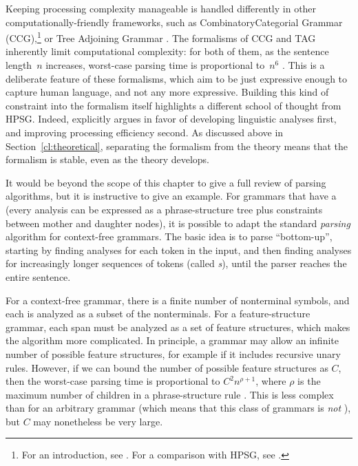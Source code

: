 \documentclass[output=paper,biblatex,babelshorthands,newtxmath,draftmode,colorlinks,citecolor=brown]{langscibook}
\begin{document}
\largerpage 
Keeping processing complexity manageable is handled differently in other computationally-friendly frameworks, such as Combinatory\indexccg Categorial Grammar (CCG),\footnote{%
	For an introduction, see \citet{steedman2011ccg}.
	For a comparison with HPSG, see .
}
or Tree Adjoining Grammar \citep[TAG;][]{Joshi87a-u,SAJ88a-u}.
The formalisms of CCG and TAG inherently limit computational complexity:
for both of them, as the sentence length~$n$ increases,
worst-case parsing time is proportional to~$n^6$ \citep{Kasamietal1989}.
This is a deliberate feature of these formalisms,
which aim to be just expressive enough to capture human language,
and not any more expressive.
Building this kind of constraint into the formalism itself
highlights a different school of thought from HPSG.
Indeed, \citet[64]{MuellerCoreGram} explicitly argues
in favor of developing linguistic analyses first,
and improving processing efficiency second.
As discussed above in Section~\ref{cl:theoretical},
separating the formalism from the theory
means that the formalism is stable, even as the theory develops.

It would be beyond the scope of this chapter to give a full review of parsing
algorithms, but it is instructive to give an example.  For grammars that have a  (every analysis can be expressed as a phrase-structure tree plus constraints between
mother and daughter nodes), it is possible to adapt the standard \textit{parsing} algorithm
\citep{kay:1973} for context-free grammars.
The basic idea is to parse ``bottom-up'',
starting by finding analyses for each token in the input,
and then finding analyses for increasingly longer sequences of tokens (called \textit{s}),
until the parser reaches the entire sentence.

For a context-free grammar,
there is a finite number of nonterminal symbols,
and each  is analyzed as a subset of the nonterminals.
For a feature-structure grammar, each span must be analyzed as a set of feature structures,
which makes the algorithm more complicated.
In principle, a grammar may allow an infinite number of possible feature structures,
for example if it includes recursive unary rules.
However, if we can bound the number of possible feature structures as $C$,
then the worst-case parsing time is proportional to $C^2 n^{\rho+1}$,
where $\rho$ is the maximum number of children in a phrase-structure rule
\citep[Section~3.2.3]{carroll1993parse}. 
This is less complex than for an arbitrary grammar
(which means that this class of grammars is \emph{not} ),
but $C$ may nonetheless be very large.
\end{document}
